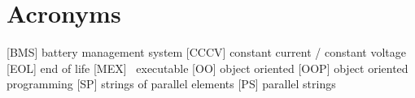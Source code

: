 \section*{Acronyms}
\thispagestyle{plain}
\begin{acronym}
	[BMS] battery management system
	[CCCV] constant current / constant voltage
	[EOL] end of life
	[MEX] \matlab\ executable
	[OO] object oriented
	[OOP] object oriented programming
	[SP] strings of parallel elements
	[PS] parallel strings
\end{acronym}